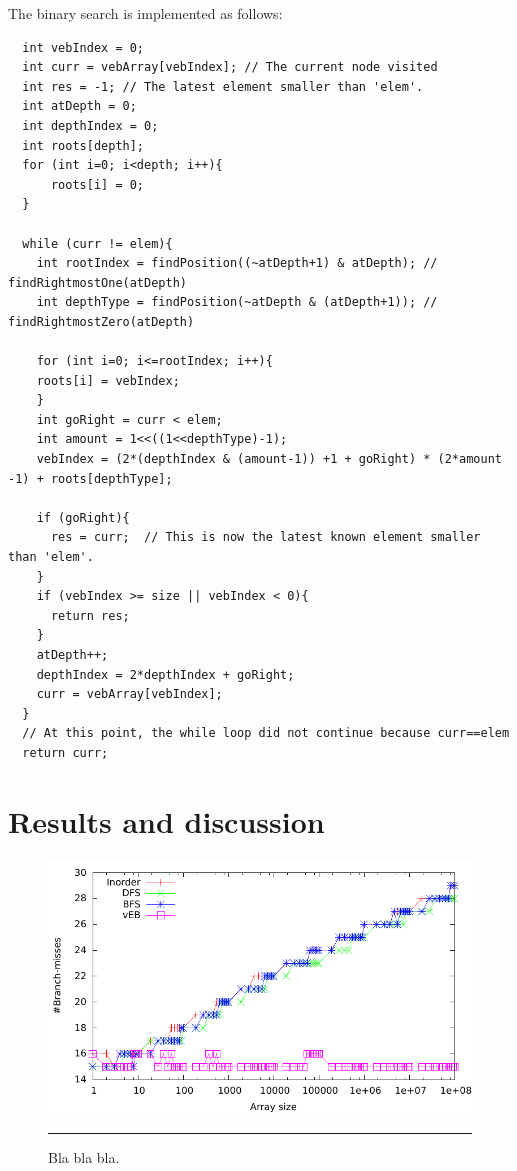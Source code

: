 The binary search is implemented as follows:
\begin{verbatim}
  int vebIndex = 0;
  int curr = vebArray[vebIndex]; // The current node visited
  int res = -1; // The latest element smaller than 'elem'.
  int atDepth = 0;
  int depthIndex = 0;
  int roots[depth];
  for (int i=0; i<depth; i++){
      roots[i] = 0;
  }
    
  while (curr != elem){
    int rootIndex = findPosition((~atDepth+1) & atDepth); // findRightmostOne(atDepth)
    int depthType = findPosition(~atDepth & (atDepth+1)); // findRightmostZero(atDepth)

    for (int i=0; i<=rootIndex; i++){
	roots[i] = vebIndex;
    }
    int goRight = curr < elem;
    int amount = 1<<((1<<depthType)-1);
    vebIndex = (2*(depthIndex & (amount-1)) +1 + goRight) * (2*amount -1) + roots[depthType];

    if (goRight){
      res = curr;  // This is now the latest known element smaller than 'elem'.
    }
    if (vebIndex >= size || vebIndex < 0){
      return res;
    }
    atDepth++;
    depthIndex = 2*depthIndex + goRight;
    curr = vebArray[vebIndex];
  }
  // At this point, the while loop did not continue because curr==elem
  return curr;
\end{verbatim}








\section{Results and discussion}



\begin{figure}[htbp]
	\centering
		\includegraphics[width=\textwidth]{./Figures/Project1/Branch_misses.pdf}
		\rule{35em}{0.5pt}
	\caption[Branch misses]{
	Bla bla bla.
	}
	\label{fig:Branch_misses}
\end{figure}


